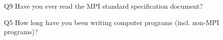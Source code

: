 \begin{description}%
\item{Q9} Have you ever read the MPI standard specification document?%
\item{Q5} How long have you been writing computer programs (incl. non-MPI programs)?%
\end{description}%
